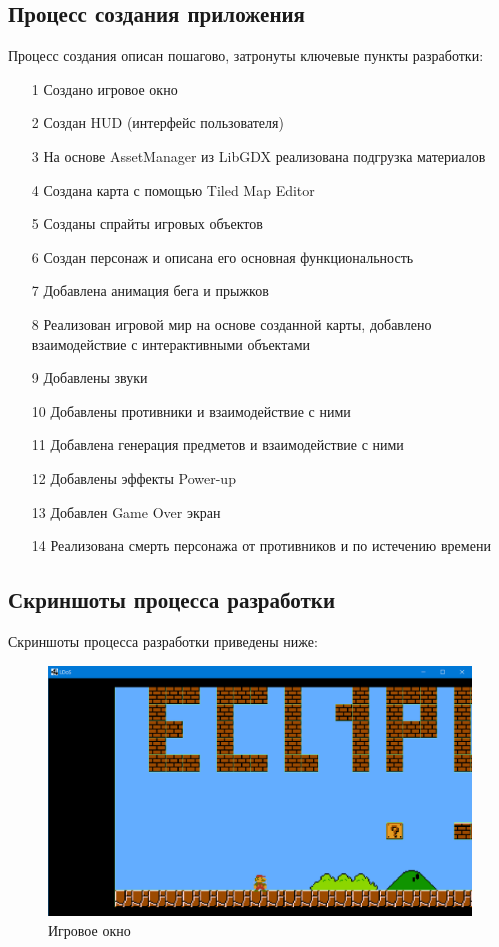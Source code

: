 \subsection{Процесс создания приложения}
Процесс создания описан пошагово, затронуты ключевые пункты разработки:
\begin{enumerate}
\item[1]  Создано игровое окно
\item[2]  Создан HUD (интерфейс пользователя)
\item[3]  На основе AssetManager из LibGDX реализована подгрузка материалов
\item[4]  Создана карта с помощью Tiled Map Editor
\item[5]  Созданы спрайты игровых объектов
\item[6]  Создан персонаж и описана его основная функциональность
\item[7]  Добавлена анимация бега и прыжков
\item[8]  Реализован игровой мир на основе созданной карты, добавлено взаимодействие с интерактивными объектами
\item[9]  Добавлены звуки
\item[10]  Добавлены противники и взаимодействие с ними
\item[11]  Добавлена генерация предметов и взаимодействие с ними
\item[12]  Добавлены эффекты Power-up
\item[13]  Добавлен Game Over экран
\item[14]  Реализована смерть персонажа от противников и по истечению времени

\end{enumerate}

\subsection{Скриншоты процесса разработки}
Скриншоты процесса разработки приведены ниже:
\\
\begin{figure}[H]
	\begin{center}
		\includegraphics[scale=0.7]{pics/Screenshot_4.png}
		\caption{Игровое окно} 
		\label{pic:pic_name} %
	\end{center}
\end{figure}


